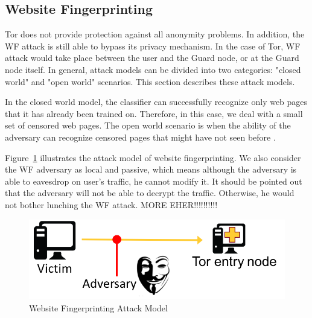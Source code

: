 \subsection{Website Fingerprinting}

Tor does not provide protection against all anonymity problems. In addition, the WF attack is still able to bypass its privacy mechanism. In the case of Tor, WF attack would take place between the user and the Guard node, or at the Guard node itself. In general, attack models can be divided into two categories: "closed world" and "open world" scenarios.  This section describes these attack models.

In the closed world model, the classifier can successfully recognize only web pages that it has already been trained on. Therefore, in this case, we deal with a small set of censored web pages. The open world scenario is when the ability of the adversary can recognize censored pages that might have not seen before \cite{TorBlog}.


Figure~\ref{fig:attack} illustrates the attack model of website fingerprinting. We also consider the WF adversary as local and passive, which means although the adversary is able to eavesdrop on user's traffic, he cannot modify it. It should be pointed out that the adversary will not be able to decrypt the traffic. Otherwise, he would not bother lunching the WF attack. 
MORE EHER!!!!!!!!!!
\begin{figure}[h]
\includegraphics[width=0.7\columnwidth]{figures/attack_model.png}
\centering
\caption{Website Fingerprinting Attack Model~\cite{juarez14}}
\label{fig:attack}
\end{figure}


